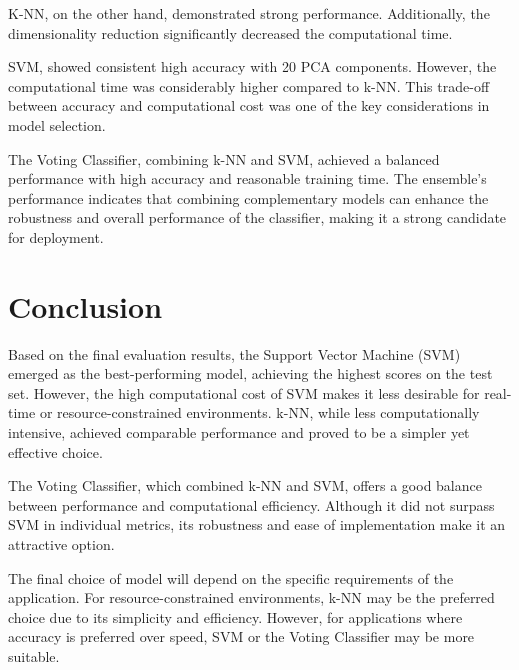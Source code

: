 \documentclass[twocolumn]{article}
\begin{document}
K-NN, on the other hand, demonstrated strong performance. Additionally, the dimensionality reduction significantly decreased the computational time.

SVM, showed consistent high accuracy with 20 PCA components. However, the computational time was considerably higher compared to k-NN. 
This trade-off between accuracy and computational cost was one of the key considerations in model selection.

The Voting Classifier, combining k-NN and SVM, achieved a balanced performance with high accuracy and reasonable training time. 
The ensemble's performance indicates that combining complementary models can enhance the robustness and overall performance of the classifier,
making it a strong candidate for deployment.

\section{Conclusion}
Based on the final evaluation results, the Support Vector Machine (SVM) emerged as the best-performing model, 
achieving the highest scores on the test set. However, the high computational cost of SVM makes it less
desirable for real-time or resource-constrained environments. k-NN, while less computationally intensive, achieved comparable 
performance and proved to be a simpler yet effective choice.

The Voting Classifier, which combined k-NN and SVM, offers a good balance between performance and computational efficiency. Although
it did not surpass SVM in individual metrics, its robustness and ease of implementation make it an attractive option.

The final choice of model will depend on the specific requirements of the application. For resource-constrained environments,
k-NN may be the preferred choice due to its simplicity and efficiency. However, for applications where accuracy is preferred over speed,
SVM or the Voting Classifier may be more suitable.
\end{document}

